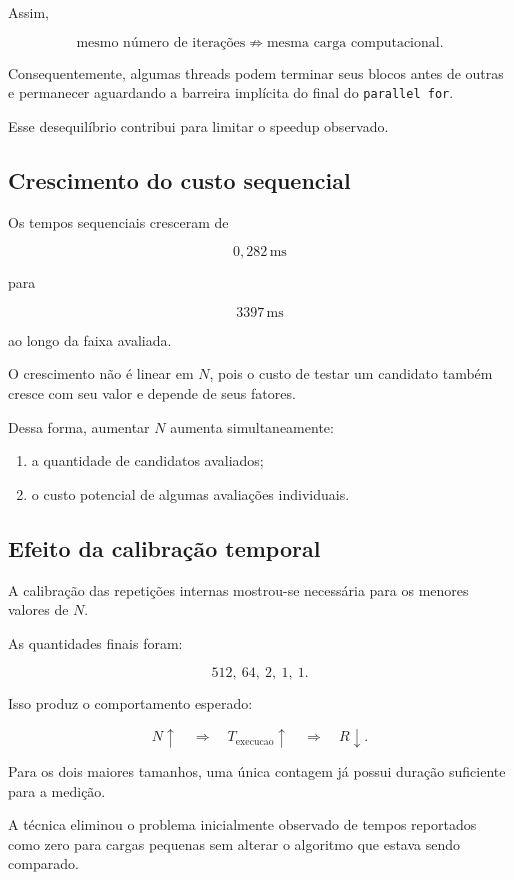 Assim,

\[
\text{mesmo número de iterações}
\not\Rightarrow
\text{mesma carga computacional}.
\]

Consequentemente, algumas threads podem terminar seus blocos antes de outras
e permanecer aguardando a barreira implícita do final do
\texttt{parallel for}.

Esse desequilíbrio contribui para limitar o speedup observado.


\subsection{Crescimento do custo sequencial}

Os tempos sequenciais cresceram de

\[
0,282\,\mathrm{ms}
\]

para

\[
3397\,\mathrm{ms}
\]

ao longo da faixa avaliada.

O crescimento não é linear em \(N\), pois o custo de testar um candidato
também cresce com seu valor e depende de seus fatores.

Dessa forma, aumentar \(N\) aumenta simultaneamente:

\begin{enumerate}
    \item a quantidade de candidatos avaliados;
    \item o custo potencial de algumas avaliações individuais.
\end{enumerate}


\subsection{Efeito da calibração temporal}

A calibração das repetições internas mostrou-se necessária para os menores
valores de \(N\).

As quantidades finais foram:

\[
512,\ 64,\ 2,\ 1,\ 1.
\]

Isso produz o comportamento esperado:

\[
N \uparrow
\quad\Rightarrow\quad
T_{\mathrm{execucao}} \uparrow
\quad\Rightarrow\quad
R \downarrow.
\]

Para os dois maiores tamanhos, uma única contagem já possui duração
suficiente para a medição.

A técnica eliminou o problema inicialmente observado de tempos reportados
como zero para cargas pequenas sem alterar o algoritmo que estava sendo
comparado.


